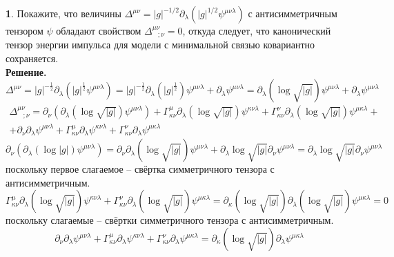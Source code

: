 \documentclass[12pt]{article}
\theoremstyle{definition}
\newtheorem{zad}{}[section]
\begin{document}
\begin{zad}
Покажите, что величины $\Delta^{\mu\nu}=|g|^{-1/2}\partial_\lambda(|g|^{1/2}\psi^{\mu\nu\lambda})$ с антисимметричным тензором $\psi$ обладают свойством $\Delta^{\mu\nu}_{\;\;\;;\nu} = 0$, откуда следует, что канонический тензор энергии импульса для модели с минимальной связью ковариантно сохраняется.\\
\textbf{Решение.}\\
\begin{equation}
    \Delta^{\mu\nu}=|g|^{-\frac{1}{2}}\partial_\lambda(|g|^{\frac{1}{2}}\psi^{\mu\nu\lambda})=|g|^{-\frac{1}{2}}\partial_\lambda(|g|^\frac{1}{2})\psi^{\mu\nu\lambda}+\partial_\lambda\psi^{\mu\nu\lambda}=\partial_\lambda(\log\sqrt{|g|})\psi^{\mu\nu\lambda}+\partial_\lambda\psi^{\mu\nu\lambda}
\end{equation}
\begin{multline}
    \Delta^{\mu\nu}_{\;\;\;;\nu}=\partial_\nu\left(\partial_\lambda(\log\sqrt{|g|})\psi^{\mu\nu\lambda}\right)+\Gamma^\mu_{\kappa\nu}\partial_\lambda(\log\sqrt{|g|})\psi^{\kappa\nu\lambda}+\Gamma^\nu_{\kappa\nu}\partial_\lambda(\log\sqrt{|g|})\psi^{\mu\kappa\lambda}+\\+\partial_\nu\partial_\lambda\psi^{\mu\nu\lambda}+\Gamma^\mu_{\kappa\nu}\partial_\lambda\psi^{\kappa\nu\lambda}+\Gamma^\nu_{\kappa\nu}\partial_\lambda\psi^{\mu\kappa\lambda}
\end{multline}
\begin{equation}
    \partial_\nu\left(\partial_\lambda(\log|g|)\psi^{\mu\nu\lambda}\right)=\partial_\nu\partial_\lambda(\log\sqrt{|g|})\psi^{\mu\nu\lambda}+\partial_\lambda\log\sqrt{|g|}\partial_\nu\psi^{\mu\nu\lambda}=\partial_\lambda\log\sqrt{|g|}\partial_\nu\psi^{\mu\nu\lambda}
\end{equation}
поскольку первое слагаемое -- свёртка симметричного тензора с антисимметричным.
\begin{equation}
    \Gamma^\mu_{\kappa\nu}\partial_\lambda(\log\sqrt{|g|})\psi^{\kappa\nu\lambda}+\Gamma^\nu_{\kappa\nu}\partial_\lambda(\log\sqrt{|g|})\psi^{\mu\kappa\lambda}=\partial_\kappa(\log\sqrt{|g|})\partial_\lambda(\log\sqrt{|g|})\psi^{\mu\kappa\lambda}=0
\end{equation}
поскольку слагаемые -- свёртки симметричного тензора с антисимметричным.
\begin{equation}
    \partial_\nu\partial_\lambda\psi^{\mu\nu\lambda}+\Gamma^\mu_{\kappa\nu}\partial_\lambda\psi^{\kappa\nu\lambda}+\Gamma^\nu_{\kappa\nu}\partial_\lambda\psi^{\mu\kappa\lambda}=\partial_\kappa(\log\sqrt{|g|})\partial_\lambda\psi^{\mu\kappa\lambda}

\end{equation}
\end{zad}
\end{document}
